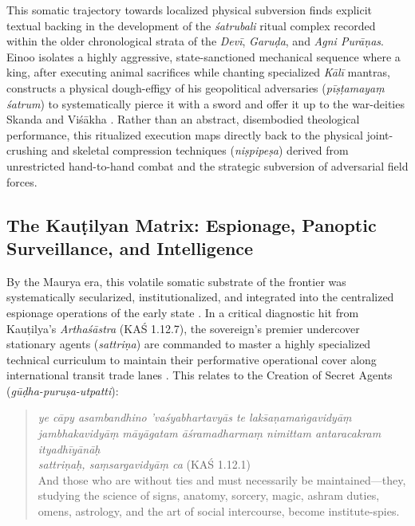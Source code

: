 \documentclass[11pt,twoside,letterpaper]{article}
\begin{document}
This somatic trajectory towards localized physical subversion finds explicit textual backing in the development of the \textit{śatrubali} ritual complex recorded within the older chronological strata of the \textit{Devī}, \textit{Garuḍa}, and \textit{Agni Purāṇas}. Einoo isolates a highly aggressive, state-sanctioned mechanical sequence where a king, after executing animal sacrifices while chanting specialized \textit{Kālī} mantras, constructs a physical dough-effigy of his geopolitical adversaries (\textit{pīṣṭamayaṃ śatrum}) to systematically pierce it with a sword and offer it up to the war-deities Skanda and Viśākha \citep{Einoo1999}. Rather than an abstract, disembodied theological performance, this ritualized execution maps directly back to the physical joint-crushing and skeletal compression techniques (\textit{niṣpipeṣa}) derived from unrestricted hand-to-hand combat and the strategic subversion of adversarial field forces.

\subsection{The Kauṭilyan Matrix: Espionage, Panoptic Surveillance, and Intelligence}

By the Maurya era, this volatile somatic substrate of the frontier was systematically secularized, institutionalized, and integrated into the centralized espionage operations of the early state \citep{Kangle1969}. In a critical diagnostic hit from Kauṭilya’s \textit{Arthaśāstra} (KAŚ 1.12.7), the sovereign’s premier undercover stationary agents (\textit{sattriṇa}) are commanded to master a highly specialized technical curriculum to maintain their performative operational cover along international transit trade lanes \citep{Kangle1969}. This relates to the Creation of Secret Agents ({\textit{gūḍha-puruṣa-utpatti}}):

\begin{quote}
\textit{ye cāpy asambandhino 'vaśyabhartavyās te laks̄aṇamaṅgavidyāṃ\\
jambhakavidyāṃ māyāgatam āśramadharmaṃ nimittam antaracakram ityadhīyānāḥ\\
sattriṇaḥ, saṃsargavidyāṃ ca} (KAŚ 1.12.1)\\
And those who are without ties and must necessarily be maintained—they,
studying the science of signs, anatomy, sorcery, magic, ashram duties,
omens, astrology, and the art of social intercourse, become institute-spies. \\
\end{quote}
\end{document}
